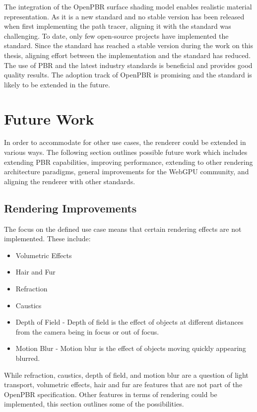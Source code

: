 The integration of the \gls{OpenPBR} surface shading model enables realistic material representation. As it is a new standard and no stable version has been released when first implementing the path tracer, aligning it with the standard was challenging. To date, only few open-source projects have implemented the standard. Since the standard has reached a stable version during the work on this thesis, aligning effort between the implementation and the standard has reduced. The use of \gls{PBR} and the latest industry standards is beneficial and provides good quality results. The adoption track of \gls{OpenPBR} is promising and the standard is likely to be extended in the future.


\section{Future Work}

In order to accommodate for other use cases, the renderer could be extended in various ways. The following section outlines possible future work which includes extending \gls{PBR} capabilities, improving performance, extending to other rendering architecture paradigms, general improvements for the \gls{WebGPU} community, and aligning the renderer with other standards.

\subsection*{Rendering Improvements}

The focus on the defined use case means that certain rendering effects are not implemented. These include:

\begin{itemize}
    \item{Volumetric Effects}
    \item{Hair and Fur}
    \item{Refraction}
    \item{Caustics}
    \item{Depth of Field} - Depth of field is the effect of objects at different distances from the camera being in focus or out of focus.
    \item{Motion Blur} - Motion blur is the effect of objects moving quickly appearing blurred.
\end{itemize}

While refraction, caustics, depth of field, and motion blur are a question of light transport, volumetric effects, hair and fur are features that are not part of the \gls{OpenPBR} specification. Other features in terms of rendering could be implemented, this section outlines some of the possibilities.

